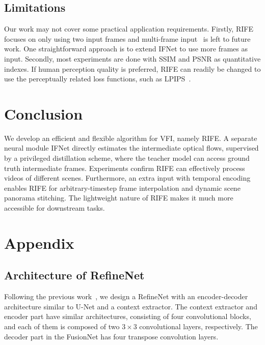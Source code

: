 \documentclass[final]{cvpr}
\begin{document}
\subsection{Limitations}
\label{sec:limitation}
Our work may not cover some practical application requirements. Firstly, RIFE focuses on only using two input frames and multi-frame input~\cite{xu2019quadratic, liu2020enhanced, kalluri2020flavr} is left to future work. One straightforward approach is to extend IFNet to use more frames as input. Secondly, most experiments are done with SSIM and PSNR as quantitative indexes. If human perception quality is preferred, RIFE can readily be changed to use the perceptually related loss functions, such as LPIPS~\cite{blau2018perception, niklaus2017video}.

 	\section{Conclusion}
We develop an efficient and flexible algorithm for VFI, namely RIFE. A separate neural module IFNet directly estimates the intermediate optical flows, supervised by a privileged distillation scheme, where the teacher model can access ground truth intermediate frames. Experiments confirm RIFE can effectively process videos of different scenes. Furthermore, an extra input with temporal encoding enables RIFE for arbitrary-timestep frame interpolation and dynamic scene panorama stitching. The lightweight nature of RIFE makes it much more accessible for downstream tasks.     
{\small
		    
		
	}
	\clearpage
\section{Appendix}

\subsection{Architecture of RefineNet}
Following the previous work~\cite{niklaus2020softmax}, we design a RefineNet with an encoder-decoder architecture similar to U-Net and a context extractor. The context extractor and encoder part have similar architectures, consisting of four convolutional blocks, and each of them is composed of two $3\times 3$ convolutional layers, respectively. The decoder part in the FusionNet has four transpose convolution layers. 
\end{document}

